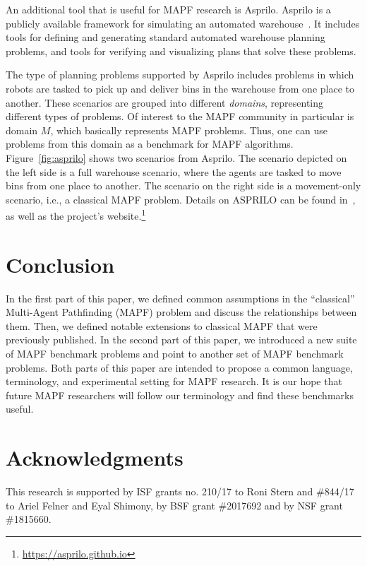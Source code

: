 \documentclass[letterpaper]{article} %
\newcommand{\mapf}{\ac{MAPF}\xspace}
\newcommand{\comment}[1]{{\nb{\textbf{Comment:}}{orange}{#1}}}
\begin{document}
An additional tool that is useful for \mapf research is Asprilo.
Asprilo is a publicly available framework for simulating an automated warehouse~\cite{martin2018experimenting}. It includes tools for defining and generating standard automated warehouse planning problems, and tools for verifying and visualizing plans that solve these problems.

The type of planning problems supported by Asprilo includes problems in which robots are tasked to pick up and deliver bins in the warehouse from one place to another. These scenarios are grouped into different \emph{domains}, representing different types of problems. Of interest to the \mapf community in particular is domain $M$, which basically represents \mapf problems. Thus, one can use problems from this domain as a benchmark for \mapf algorithms.
Figure~\ref{fig:asprilo} shows two scenarios from Asprilo. The scenario depicted on the left side is a full warehouse scenario, where the agents are tasked to move bins from one place to another. The scenario on the right side is a movement-only scenario, i.e., a classical \mapf problem.
Details on ASPRILO can be found in~\cite{martin2018experimenting}, as well as the project's website.\footnote{\url{https://asprilo.github.io}}

\section{Conclusion}
In the first part of this paper, we defined common assumptions in the ``classical'' Multi-Agent Pathfinding (\mapf) problem and discuss the relationships between them. Then, we defined notable extensions to classical \mapf that were previously published.
In the second part of this paper, we introduced a new suite of \mapf benchmark problems and point to another set of \mapf benchmark problems.
Both parts of this paper are intended to propose a common language, terminology, and experimental setting for \mapf research. It is our hope that future \mapf researchers will follow our terminology and find these benchmarks useful.

\section{Acknowledgments}
This research is supported by ISF grants no. 210/17 to Roni Stern and \#844/17 to Ariel Felner and Eyal Shimony, by BSF grant \#2017692 and by NSF grant \#1815660. %
\end{document}
